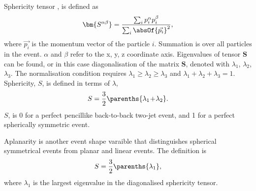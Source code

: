 Sphericity tensor \cite{PhysRevLett.35.1609}, is defined as
\begin{equation}
\bm{S^{\alpha\beta}} = \frac{\sum_{i}p^{\alpha}_{i}p^{\beta}_{i}}{\sum_{i}\absOf{\vec{p_{i}}}^2},
\end{equation}
where $\vec{p_{i}}$ is the momentum vector of the particle $i$. Summation is over all particles in the event. $\alpha$ and $\beta$ refer to the x, y, z coordinate axis. Eigenvalues of tensor $\bm{S}$ can be found, or in this case diagonalisation of the matrix $\bm{S}$, denoted with $\lambda_{1}$, $\lambda_{2}$, $\lambda_{3}$. The normalisation condition requires $\lambda_{1}\!\geqslant\! \lambda_{2} \! \geqslant \! \lambda_{3}$ and $ \lambda_{1} \! + \! \lambda_{2} \! + \! \lambda_{3} \! = \! 1 $. Sphericity, $S$, is defined in terms of $\lambda$,
\begin{equation}
S = \frac{3}{2}\parenths{\lambda_{1} \! + \! \lambda_{2}}.
\end{equation}
$S$, is 0 for a perfect pencillike back-to-back two-jet event, and 1 for a perfect spherically symmetric event.

Aplanarity is another event shape varaible that distinguishes spherical symmetrical events from planar and linear events. The definition is
\begin{equation}
S = \frac{3}{2}\parenths{\lambda_{1}},
\end{equation}
where $\lambda_{1}$ is the largest eigenvalue in the diagonalised sphericity tensor.

